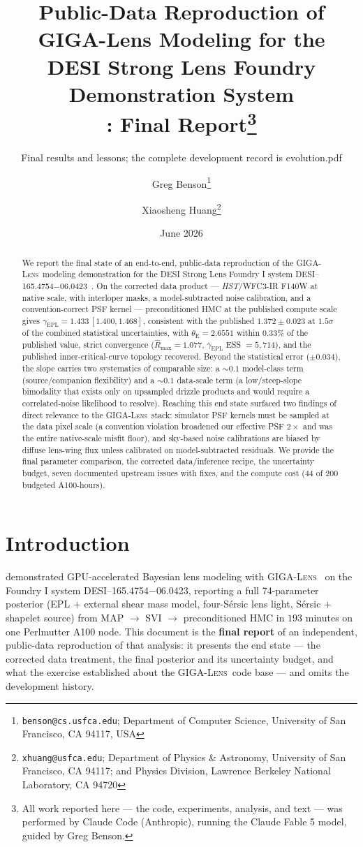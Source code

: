 \documentclass[11pt,letterpaper]{article}
\title{Public-Data Reproduction of GIGA-Lens Modeling for the\\
       DESI Strong Lens Foundry Demonstration System\\
       \foundry: Final Report\thanks{All work reported here --- the
       code, experiments, analysis, and text --- was performed by
       Claude Code (Anthropic), running the Claude Fable 5 model,
       guided by Greg Benson.}}
\author{Greg Benson\thanks{\texttt{benson@cs.usfca.edu};
        Department of Computer Science, University of San Francisco,
        CA 94117, USA} \and
        Xiaosheng Huang\thanks{\texttt{xhuang@usfca.edu};
        Department of Physics \& Astronomy, University of San Francisco,
        CA 94117; and Physics Division, Lawrence Berkeley National
        Laboratory, CA 94720}}
\date{June 2026}
\newcommand{\thetaE}{\ensuremath{\theta_{\mathrm{E}}}}
\newcommand{\gammaEPL}{\ensuremath{\gamma_{\mathrm{EPL}}}}
\newcommand{\foundry}{DESI--165.4754$-$06.0423}
\newcommand{\gigalens}{\textsc{GIGA-Lens}}
\begin{document}
\maketitle
\subtitle{Final results and lessons; the complete development record is evolution.pdf}

\begin{abstract}
We report the final state of an end-to-end, public-data reproduction of
the \gigalens\ modeling demonstration for the DESI Strong Lens Foundry I
system \foundry\ \citep{huang2025foundry1}. On the corrected data
product --- {\it HST}/WFC3-IR F140W at native scale, with interloper
masks, a model-subtracted noise calibration, and a convention-correct
PSF kernel --- preconditioned HMC at the published compute scale gives
$\gammaEPL = 1.433\,[1.400, 1.468]$, consistent with the published
$1.372\pm0.023$ at $1.5\sigma$ of the combined statistical
uncertainties, with $\thetaE = 2.6551$ within $0.33\%$
of the published value, strict convergence
($\hat R_{\max}=1.077$, $\gammaEPL$ ESS $=5{,}714$), and the published
inner-critical-curve topology recovered. Beyond the statistical error
($\pm0.034$), the slope carries two systematics of comparable size: a
$\sim$$0.1$ model-class term (source/companion flexibility) and a
$\sim$$0.1$ data-scale term (a low/steep-slope bimodality that exists
only on upsampled drizzle products and would require a correlated-noise
likelihood to resolve). Reaching this end state surfaced two findings of
direct relevance to the \gigalens\ stack: simulator PSF kernels must be
sampled at the data pixel scale (a convention violation broadened our
effective PSF $2\times$ and was the entire native-scale misfit floor),
and sky-based noise calibrations are biased by diffuse lens-wing flux
unless calibrated on model-subtracted residuals. We provide the final
parameter comparison, the corrected data/inference recipe, the
uncertainty budget, seven documented upstream issues with fixes, and
the compute cost ($44$ of $200$ budgeted A100-hours).
\end{abstract}

\section{Introduction}
\label{sec:intro}

\citet{huang2025foundry1} demonstrated GPU-accelerated Bayesian lens
modeling with \gigalens\ \citep{gu2022gigalens} on the Foundry I system
\foundry, reporting a full 74-parameter posterior (EPL $+$ external
shear mass model, four-S\'{e}rsic lens light, S\'{e}rsic $+$ shapelet
source) from MAP $\to$ SVI $\to$ preconditioned HMC in $193$ minutes on
one Perlmutter A100 node. This document is the {\bf final report} of an
independent, public-data reproduction of that analysis: it presents the
end state --- the corrected data treatment, the final posterior and its
uncertainty budget, and what the exercise established about the
\gigalens\ code base --- and omits the development history.
\end{document}
